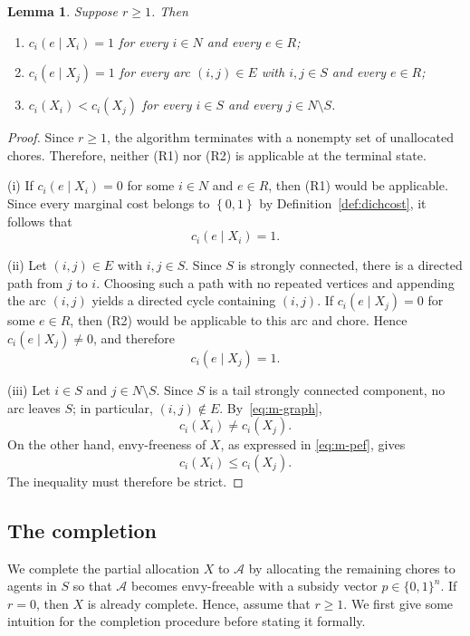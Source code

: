 \documentclass[sigconf,anonymous]{aamas}
\newcommand{\agents}{N}
\newcommand{\cost}{c}
\newcommand{\set}[1]{\left\{#1\right\}}
\theoremstyle{acmplain}
\newtheorem{lemma}[theorem]{Lemma}
\theoremstyle{acmdefinition}
\theoremstyle{acmplain}
\begin{document}
\begin{lemma}
\label{lem:m-terminal}
Suppose $r \ge 1$. Then
\begin{enumerate}
  \item[(i)] $\cost_i(e \mid X_i) = 1$ for every $i \in \agents$ and every $e \in R$;
  \item[(ii)] $\cost_i(e \mid X_j) = 1$ for every arc $(i,j) \in E$ with  $i,j \in S$ and every $e \in R$;
  \item[(iii)] $\cost_i(X_i) < \cost_i(X_j)$ for every $i \in S$ and every $j \in \agents \setminus S$.
\end{enumerate}
\end{lemma}

\begin{proof} Since $r\geq 1$, the algorithm terminates with a nonempty set of unallocated chores. Therefore, neither \textnormal{(R1)} nor \textnormal{(R2)} is applicable at the terminal state.

(i) If $\cost_i(e\mid X_i)=0$ for some $i\in\agents$ and $e\in R$, then \textnormal{(R1)} would be applicable. Since every marginal cost belongs to $\set{0,1}$ by Definition~\ref{def:dichcost}, it follows that
\[
    \cost_i(e\mid X_i)=1.
\]

(ii) Let $(i,j)\in E$ with $i,j\in S$. Since $S$ is strongly connected, there is a directed path from $j$ to $i$. Choosing such a path with no repeated vertices and appending the arc $(i,j)$ yields a directed cycle containing $(i,j)$. If $\cost_i(e\mid X_j)=0$ for some $e\in R$, then \textnormal{(R2)} would be applicable to this arc and chore. Hence $\cost_i(e\mid X_j)\neq 0$, and therefore
\[
    \cost_i(e\mid X_j)=1.
\]

(iii) Let $i\in S$ and $j\in\agents\setminus S$. Since $S$ is a tail strongly connected component, no arc leaves $S$; in particular, $(i,j)\notin E$. By~\eqref{eq:m-graph},
\[
    \cost_i(X_i)\neq \cost_i(X_j).
\]
On the other hand, envy-freeness of $X$, as expressed in \eqref{eq:m-pef}, gives
\[
    \cost_i(X_i)\leq \cost_i(X_j).
\]
The inequality must therefore be strict.
\end{proof}
\subsection{The completion}
\label{sec:m-completion}
We complete the partial allocation $X$ to $\mathcal{A}$ by allocating the remaining chores to agents in $S$ so that $\mathcal{A}$ becomes envy-freeable with a subsidy vector $p\in\{0,1\}^n$. If $r=0$, then $X$ is already complete. Hence, assume that $r\geq 1$. We first give some intuition for the completion procedure before stating it formally.
\end{document}

